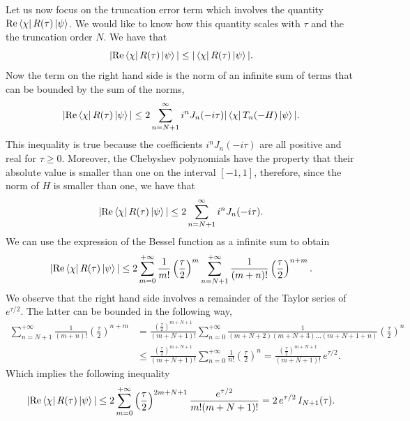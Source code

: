\documentclass[a4paper,11pt]{article}
\begin{document}
Let us now focus on the truncation error term which involves the quantity $\mathrm{Re}\bra{\chi}R(\tau)\ket{\psi}$. We would like to know how this quantity scales with $\tau$ and the the truncation order $N$. We have that 
\begin{equation}
    |\mathrm{Re}\bra{\chi}R(\tau)\ket{\psi}| \leq |\bra{\chi}R(\tau)\ket{\psi}|.
\end{equation}
Now the term on the right hand side is the norm of an infinite sum of terms that can be bounded by the sum of the norms,
\begin{equation}
  |\mathrm{Re}\bra{\chi}R(\tau)\ket{\psi}| \leq
  2\sum_{n=N+1}^{\infty} i^n J_n(-i\tau)|\bra{\chi}T_n(-H)\ket{\psi}|.
\end{equation}
This inequality is true because the coefficients $i^n J_n(-i\tau)$ are all positive and real for $\tau \geq 0$. Moreover, the Chebyshev polynomials have the property that their absolute value is smaller than one on the interval $[-1,1]$, therefore, since the norm of $H$ is smaller than one, we have that
\begin{equation}
  |\mathrm{Re}\bra{\chi}R(\tau)\ket{\psi}| \leq
  2\sum_{n=N+1}^{\infty} i^n J_n(-i\tau).
\end{equation}
We can use the expression of the Bessel function as a infinite sum to obtain 
\begin{equation}
  |\mathrm{Re}\bra{\chi}R(\tau)\ket{\psi}| \leq
  2\sum_{m=0}^{+\infty}\frac{1}{m!}\left(\frac{\tau}{2}\right)^m\sum_{n=N+1}^{+\infty}\frac{1}{(m+n)!}\left(\frac{\tau}{2}\right)^{n+m}.
\end{equation}
We observe that the right hand side involves a remainder of the Taylor series of $e^{\tau/2}$. The latter can be bounded in the following way,
\begin{equation}
    \begin{split}
    \sum_{n=N+1}^{+\infty}\frac{1}{(m+n)!}\left(\frac{\tau}{2}\right)^{n+m} 
    &=\frac{\left(\frac{\tau}{2}\right)^{m+N+1}}{(m+N+1)!}\sum_{n=0}^{+\infty}\frac{1}{(m+N+2)(m+N+3)\ldots(m+N+1+n)}\left(\frac{\tau}{2}\right)^n\\
    &\leq \frac{\left(\frac{\tau}{2}\right)^{m+N+1}}{(m+N+1)!}\sum_{n=0}^{+\infty}\frac{1}{n!}\left(\frac{\tau}{2}\right)^n=\frac{\left(\frac{\tau}{2}\right)^{m+N+1}}{(m+N+1)!}\,e^{\tau/2}.
    \end{split}
\end{equation}
Which implies the following inequality
\begin{equation}
  |\mathrm{Re}\bra{\chi}R(\tau)\ket{\psi}| \leq
  2\sum_{m=0}^{+\infty}\left(\frac{\tau}{2}\right)^{2m+N+1}\frac{e^{\tau/2}}{m!(m+N+1)!}=2\, e^{\tau/2}\,I_{N+1}(\tau).
  \label{RBound}
\end{equation}
\end{document}

